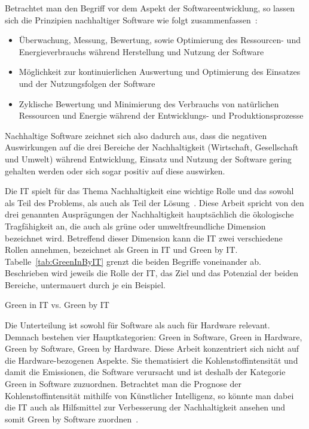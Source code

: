 Betrachtet man den Begriff vor dem Aspekt der Softwareentwicklung, so lassen sich die Prinzipien nachhaltiger Software wie folgt zusammenfassen~\cite{Calero.2015}:
\begin{itemize}
 \item Überwachung, Messung, Bewertung, sowie Optimierung des Ressourcen- und Energieverbrauchs während Herstellung und Nutzung der Software
\item Möglichkeit zur kontinuierlichen Auswertung und Optimierung des Einsatzes und der Nutzungsfolgen der Software
\item Zyklische Bewertung und Minimierung des Verbrauchs von natürlichen Ressourcen und Energie während der Entwicklungs- und Produktionsprozesse
\end{itemize}
Nachhaltige Software zeichnet sich also dadurch aus, dass die negativen Auswirkungen auf die drei Bereiche der Nachhaltigkeit (Wirtschaft, Gesellschaft und Umwelt) während Entwicklung, Einsatz und Nutzung der Software gering gehalten werden oder sich sogar positiv auf diese auswirken.

Die IT spielt für das Thema Nachhaltigkeit eine wichtige Rolle und das sowohl als Teil des Problems, als auch als Teil der Lösung~\cite{Calero.2015}.
Diese Arbeit spricht von den drei genannten Ausprägungen der Nachhaltigkeit hauptsächlich die ökologische Tragfähigkeit an, die auch als \glqq grüne\grqq{} oder \glqq umweltfreundliche\grqq{} Dimension bezeichnet wird.
Betreffend dieser Dimension kann die IT zwei verschiedene Rollen annehmen, bezeichnet als Green in IT und Green by IT.
Tabelle~\ref{tab:GreenInByIT} grenzt die beiden Begriffe voneinander ab.
Beschrieben wird jeweils die Rolle der IT, das Ziel und das Potenzial der beiden Bereiche, untermauert durch je ein Beispiel.

\begin{table}[t]
 \centering\small
 \caption{Green in IT vs. Green by IT}
 \label{tab:GreenInByIT}
 
\end{table}

Die Unterteilung ist sowohl für Software als auch für Hardware relevant.
Demnach bestehen vier Hauptkategorien:
Green in Software, Green in Hardware, Green by Software, Green by Hardware.
Diese Arbeit konzentriert sich nicht auf die Hardware-bezogenen Aspekte.
Sie thematisiert die Kohlenstoffintensität und damit die Emissionen, die Software verursacht und ist deshalb der Kategorie Green in Software zuzuordnen.
Betrachtet man die Prognose der Kohlenstoffintensität mithilfe von Künstlicher Intelligenz, so könnte man dabei die IT auch als Hilfsmittel zur Verbesserung der Nachhaltigkeit ansehen und somit Green by Software zuordnen~\cite{Calero.2015}.


